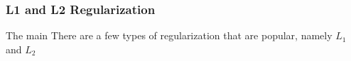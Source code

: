 \subsubsection{L1 and L2 Regularization}

The main There are a few types of regularization that are popular, namely $L_1$ and $L_2$